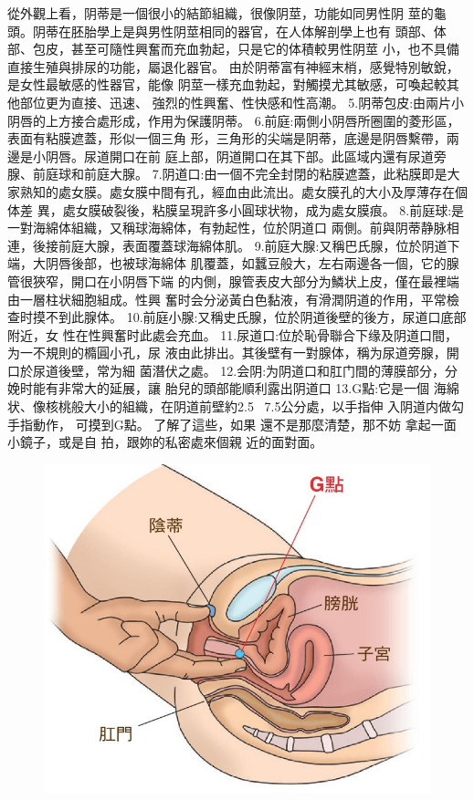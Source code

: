 \documentclass[12pt,UTF8]{ctexbook}
\begin{document}
從外觀上看，阴蒂是一個很小的結節組織，很像阴莖，功能如同男性阴
莖的龜頭。阴蒂在胚胎學上是與男性阴莖相同的器官，在人体解剖學上也有
頭部、体部、包皮，甚至可隨性興奮而充血勃起，只是它的体積較男性阴莖
小，也不具備直接生殖與排尿的功能，屬退化器官。
由於阴蒂富有神經末梢，感覺特別敏銳，是女性最敏感的性器官，能像
阴莖一樣充血勃起，對觸摸尤其敏感，可喚起較其他部位更为直接、迅速、
強烈的性興奮、性快感和性高潮。
5.阴蒂包皮:由兩片小阴唇的上方接合處形成，作用为保護阴蒂。
6.前庭:兩側小阴唇所圈圍的菱形區，表面有粘膜遮蓋，形似一個三角
形，三角形的尖端是阴蒂，底邊是阴唇繫帶，兩邊是小阴唇。尿道開口在前
庭上部，阴道開口在其下部。此區域内還有尿道旁腺、前庭球和前庭大腺。
7.阴道口:由一個不完全封閉的粘膜遮蓋，此粘膜即是大家熟知的處女膜。處女膜中間有孔，經血由此流出。處女膜孔的大小及厚薄存在個体差
異，處女膜破裂後，粘膜呈現許多小圓球状物，成为處女膜痕。
8.前庭球:是一對海綿体組織，又稱球海綿体，有勃起性，位於阴道口
兩側。前與阴蒂静脉相連，後接前庭大腺，表面覆蓋球海綿体肌。
9.前庭大腺:又稱巴氏腺，位於阴道下端，大阴唇後部，也被球海綿体
肌覆蓋，如蠶豆般大，左右兩邊各一個，它的腺管很狹窄，開口在小阴唇下端
的内側，腺管表皮大部分为鱗状上皮，僅在最裡端由一層柱状細胞組成。性興
奮时会分泌黃白色黏液，有滑潤阴道的作用，平常檢查时摸不到此腺体。
10.前庭小腺:又稱史氏腺，位於阴道後壁的後方，尿道口底部附近，女
性在性興奮时此處会充血。
11.尿道口:位於恥骨聯合下缘及阴道口間，为一不規則的橢圓小孔，尿
液由此排出。其後壁有一對腺体，稱为尿道旁腺，開口於尿道後壁，常为細
菌潛伏之處。
12.会阴:为阴道口和肛门間的薄膜部分，分娩时能有非常大的延展，讓
胎兒的頭部能順利露出阴道口
13.G點:它是一個
海綿状、像核桃般大小的組織，在阴道前壁約2.5
~7.5公分處，以手指伸
入阴道内做勾手指動作，
可摸到G點。
了解了這些，如果
還不是那麼清楚，那不妨
拿起一面小鏡子，或是自
拍，跟妳的私密處來個親
近的面對面。

\begin{figure}[htbp]
	\centering
	\includegraphics[width=0.7\linewidth]{8}
	\caption{}
	\label{fig:1}
\end{figure}
\end{document}
